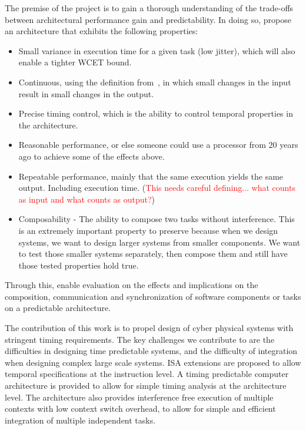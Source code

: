 The premise of the project is to gain a thorough understanding of the
trade-offs between architectural performance gain and
predictability. In doing so, propose an architecture that exhibits the
following properties:
\begin{itemize}
\item Small variance in execution time for a given task (low jitter),
  which will also enable a tighter WCET bound.
\item Continuous, using the definition from~\cite{Henzinger2008}, in
  which small changes in the input result in small changes in the
  output.
\item Precise timing control, which is the ability to control temporal
  properties in the architecture.
\item Reasonable performance, or else someone could use a processor
  from 20 years ago to achieve some of the effects above.
\item Repeatable performance, mainly that the same execution yields
  the same output. Including execution time. (\textcolor{red}{This
    needs careful defining... what counts as input and what counts as
    output?})
\item Composability - The ability to compose two tasks without
  interference. This is an extremely important property to preserve
  because when we design systems, we want to design larger systems
  from smaller components. We want to test those smaller systems
  separately, then compose them and still have those tested properties
  hold true. 
\end{itemize}
Through this, enable evaluation on the effects and implications on the
composition, communication and synchronization of software components
or tasks on a predictable architecture.


The contribution of this work is to propel design of cyber physical systems with stringent timing requirements. 
The key challenges we contribute to are the difficulties in designing time predictable systems, and the difficulty of integration when designing complex large scale systems.
ISA extensions are proposed to allow temporal specifications at the instruction level. 
A timing predictable computer architecture is provided to allow for simple timing analysis at the architecture level. 
The architecture also provides interference free execution of multiple contexts with low context switch overhead, to allow for simple and efficient integration of multiple independent tasks.



